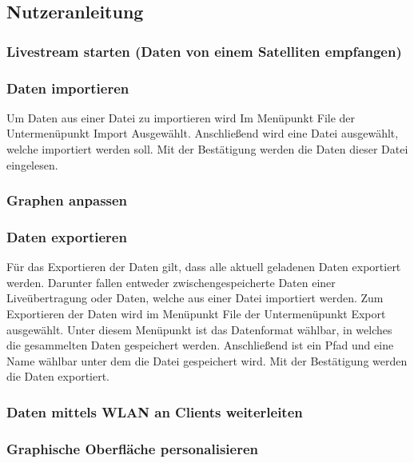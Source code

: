\subsection{Nutzeranleitung}
\subsubsection{Livestream starten (Daten von einem Satelliten empfangen)}
\subsubsection{Daten importieren}
Um Daten aus einer Datei zu importieren wird Im Menüpunkt File der Untermenüpunkt Import Ausgewählt. Anschließend wird eine Datei ausgewählt, welche importiert werden soll. Mit der Bestätigung werden die Daten dieser Datei eingelesen.
\subsubsection{Graphen anpassen}
\subsubsection{Daten exportieren}
Für das Exportieren der Daten gilt, dass alle aktuell geladenen Daten exportiert werden. Darunter fallen entweder zwischengespeicherte Daten einer Liveübertragung oder Daten, welche aus einer Datei importiert werden.
Zum Exportieren der Daten wird im Menüpunkt File der Untermenüpunkt Export ausgewählt. Unter diesem Menüpunkt ist das Datenformat wählbar, in welches die gesammelten Daten gespeichert werden. Anschließend ist ein Pfad und eine Name wählbar unter dem die Datei gespeichert wird. Mit der Bestätigung werden die Daten exportiert.
\subsubsection{Daten mittels WLAN an Clients weiterleiten}
\subsubsection{Graphische Oberfläche personalisieren}